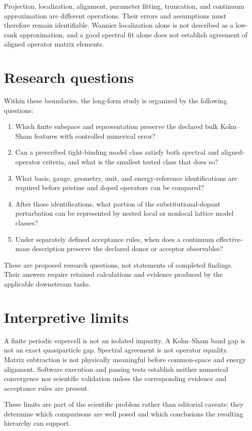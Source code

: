 Projection, localization, alignment, parameter fitting, truncation, and
continuum approximation are different operations. Their errors and assumptions
must therefore remain identifiable. Wannier localization alone is not described
as a low-rank approximation, and a good spectral fit alone does not establish
agreement of aligned operator matrix elements.

\section{Research questions}

Within these boundaries, the long-form study is organized by the following
questions:

\begin{enumerate}
  \item Which finite subspace and representation preserve the declared bulk
    Kohn--Sham features with controlled numerical error?
  \item Can a prescribed tight-binding model class satisfy both spectral and
    aligned-operator criteria, and what is the smallest tested class that does
    so?
  \item What basis, gauge, geometry, unit, and energy-reference identifications
    are required before pristine and doped operators can be compared?
  \item After those identifications, what portion of the substitutional-dopant
    perturbation can be represented by nested local or nonlocal lattice model
    classes?
  \item Under separately defined acceptance rules, when does a continuum
    effective-mass description preserve the declared donor or acceptor
    observables?
\end{enumerate}

These are proposed research questions, not statements of completed findings.
Their answers require retained calculations and evidence produced by the
applicable downstream tasks.

\section{Interpretive limits}

A finite periodic supercell is not an isolated impurity. A Kohn--Sham band gap
is not an exact quasiparticle gap. Spectral agreement is not operator equality.
Matrix subtraction is not physically meaningful before common-space and
energy alignment. Software execution and passing tests establish neither
numerical convergence nor scientific validation unless the corresponding
evidence and acceptance rules are present.

These limits are part of the scientific problem rather than editorial caveats:
they determine which comparisons are well posed and which conclusions the
resulting hierarchy can support.
